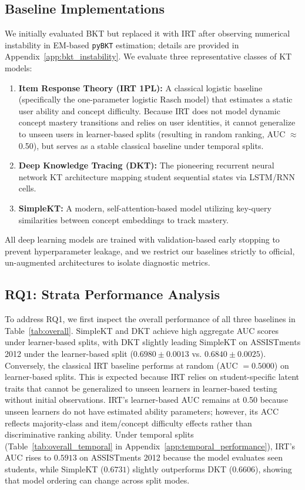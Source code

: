 \subsection{Baseline Implementations}
We initially evaluated BKT but replaced it with IRT after observing numerical instability in EM-based \texttt{pyBKT} estimation; details are provided in Appendix~\ref{app:bkt_instability}. We evaluate three representative classes of KT models:
\begin{enumerate}
    \item \textbf{Item Response Theory (IRT 1PL):} A classical logistic baseline (specifically the one-parameter logistic Rasch model) that estimates a static user ability and concept difficulty. Because IRT does not model dynamic concept mastery transitions and relies on user identities, it cannot generalize to unseen users in learner-based splits (resulting in random ranking, AUC $\approx$ 0.50), but serves as a stable classical baseline under temporal splits.
    \item \textbf{Deep Knowledge Tracing (DKT):} The pioneering recurrent neural network KT architecture mapping student sequential states via LSTM/RNN cells.
    \item \textbf{SimpleKT:} A modern, self-attention-based model utilizing key-query similarities between concept embeddings to track mastery.
\end{enumerate}

All deep learning models are trained with validation-based early stopping to prevent hyperparameter leakage, and we restrict our baselines strictly to official, un-augmented architectures to isolate diagnostic metrics.

\subsection{RQ1: Strata Performance Analysis}
To address RQ1, we first inspect the overall performance of all three baselines in Table~\ref{tab:overall}. SimpleKT and DKT achieve high aggregate AUC scores under learner-based splits, with DKT slightly leading SimpleKT on ASSISTments 2012 under the learner-based split ($0.6980 \pm 0.0013$ vs. $0.6840 \pm 0.0025$). Conversely, the classical IRT baseline performs at random (AUC $= 0.5000$) on learner-based splits. This is expected because IRT relies on student-specific latent traits that cannot be generalized to unseen learners in learner-based testing without initial observations. IRT’s learner-based AUC remains at 0.50 because unseen learners do not have estimated ability parameters; however, its ACC reflects majority-class and item/concept difficulty effects rather than discriminative ranking ability. Under temporal splits (Table~\ref{tab:overall_temporal} in Appendix~\ref{app:temporal_performance}), IRT's AUC rises to $0.5913$ on ASSISTments 2012 because the model evaluates seen students, while SimpleKT ($0.6731$) slightly outperforms DKT ($0.6606$), showing that model ordering can change across split modes.

